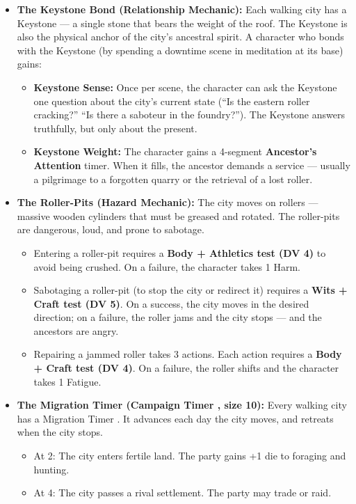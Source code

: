 \begin{itemize}
\item \textbf{The Keystone Bond (Relationship Mechanic):} Each walking city has a Keystone --- a single stone that bears the weight of the roof. The Keystone is also the physical anchor of the city's ancestral spirit. A character who bonds with the Keystone (by spending a downtime scene in meditation at its base) gains:
  \begin{itemize}
    \item \textbf{Keystone Sense:} Once per scene, the character can ask the Keystone one question about the city's current state (``Is the eastern roller cracking?'' ``Is there a saboteur in the foundry?''). The Keystone answers truthfully, but only about the present.
    \item \textbf{Keystone Weight:} The character gains a 4-segment \textbf{Ancestor's Attention} timer. When it fills, the ancestor demands a service --- usually a pilgrimage to a forgotten quarry or the retrieval of a lost roller.
  \end{itemize}
\item \textbf{The Roller-Pits (Hazard Mechanic):} The city moves on rollers --- massive wooden cylinders that must be greased and rotated. The roller-pits are dangerous, loud, and prone to sabotage.
  \begin{itemize}
    \item Entering a roller-pit requires a \textbf{Body + Athletics test (DV 4)} to avoid being crushed. On a failure, the character takes 1 Harm.
    \item Sabotaging a roller-pit (to stop the city or redirect it) requires a \textbf{Wits + Craft test (DV 5)}. On a success, the city moves in the desired direction; on a failure, the roller jams and the city stops --- and the ancestors are angry.
    \item Repairing a jammed roller takes 3 actions. Each action requires a \textbf{Body + Craft test (DV 4)}. On a failure, the roller shifts and the character takes 1 Fatigue.
  \end{itemize}
\item \textbf{The Migration Timer (Campaign Timer , size 10):} Every walking city has a Migration Timer . It advances each day the city moves, and retreats when the city stops.
  \begin{itemize}
    \item At 2: The city enters fertile land. The party gains +1 die to foraging and hunting.
    \item At 4: The city passes a rival settlement. The party may trade or raid.

\end{itemize}
\end{itemize}
